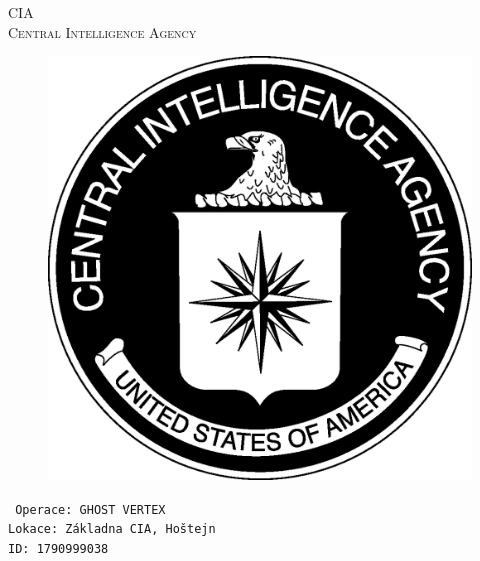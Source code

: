 \documentclass[a4paper, \fontheight]{article}
\begin{document}
	\begin{titlepage}
		\begin{center}		
			\textsc{{\fontsize{80}{0}\selectfont CIA}\\[2em]
				\Huge Central Intelligence Agency\\[2.5em]}
				
			\begin{figure}[H]
				\centering
				\includegraphics[scale=0.6]{sources/CIA_logo.eps}
			\end{figure}
		\end{center}	
		\vfill
		\noindent
		\texttt{\LARGE
				Operace: GHOST VERTEX\\[0.4em]
				Lokace: Základna CIA, Hoštejn\\[0.4em]
				ID: 1790999038}	
\end{titlepage} 
\end{document}
